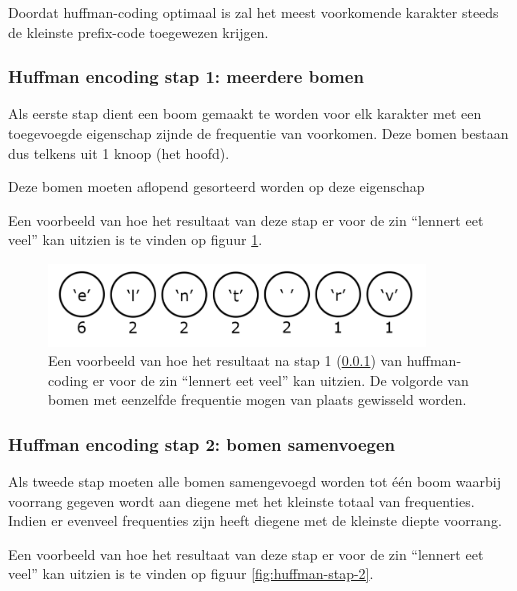 Doordat \gls{huffman-coding} optimaal is zal het meest voorkomende karakter steeds de kleinste \gls{prefix-code} toegewezen krijgen.

\subsubsection{Huffman encoding stap 1: meerdere bomen}
\label{sec:primitieve-technieken-voorbeeld-huffman-encoding-1}
Als eerste stap dient een boom gemaakt te worden voor elk karakter met een toegevoegde eigenschap zijnde de frequentie van voorkomen. Deze bomen bestaan dus telkens uit 1 knoop (het hoofd).

Deze bomen moeten aflopend gesorteerd worden op deze eigenschap 

Een voorbeeld van hoe het resultaat van deze stap er voor de zin “lennert eet veel” kan uitzien is te vinden op figuur \ref{fig:huffman-stap-1}.

\FloatBarrier
\begin{figure}[h!]
	\includegraphics[width=100mm]{img/literatuurstudie/huffman-stap-1.png}
	\caption{Een voorbeeld van hoe het resultaat na stap 1 (\ref{sec:primitieve-technieken-voorbeeld-huffman-encoding-1}) van \gls{huffman-coding} er voor de zin “lennert eet veel” kan uitzien. De volgorde van bomen met eenzelfde frequentie mogen van plaats gewisseld worden.}
	\label{fig:huffman-stap-1}
\end{figure}
\FloatBarrier

\subsubsection{Huffman encoding stap 2: bomen samenvoegen}
\label{sec:primitieve-technieken-voorbeeld-huffman-encoding-2}
Als tweede stap moeten alle bomen samengevoegd worden tot één boom waarbij voorrang gegeven wordt aan diegene met het kleinste totaal van frequenties. Indien er evenveel frequenties zijn heeft diegene met de kleinste diepte voorrang.

Een voorbeeld van hoe het resultaat van deze stap er voor de zin “lennert eet veel” kan uitzien is te vinden op figuur \ref{fig:huffman-stap-2}.

